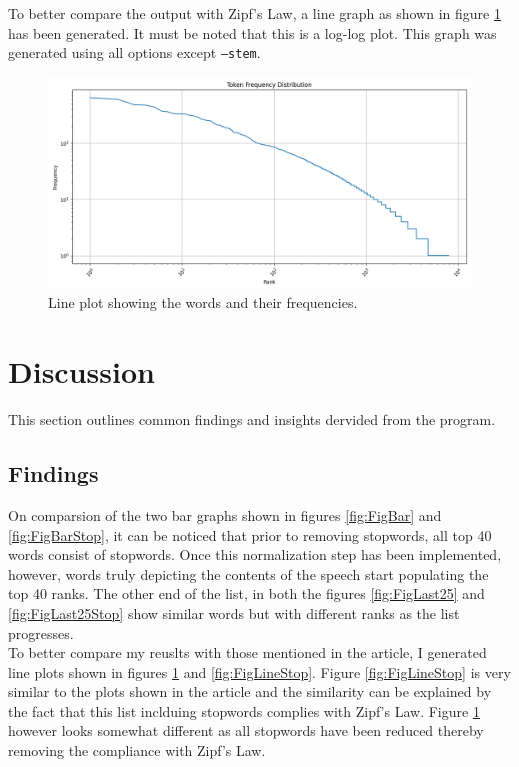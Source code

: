 \documentclass[titlepage]{article}
\begin{document}
To better compare the output with Zipf's Law, a line graph as shown in figure \ref{fig:FigLine} has 
been generated. It must be noted that this is a log-log plot. This graph was generated using all 
options except \texttt{--stem}.

\begin{figure}[H]
    \centering
    \includegraphics[width=\textwidth]{figures/line_plot.png}
    \caption{Line plot showing the words and their frequencies.}
    \label{fig:FigLine}
\end{figure}

\section{Discussion}
This section outlines common findings and insights dervided from the program.
\subsection{Findings}
On comparsion of the two bar graphs shown in figures \ref{fig:FigBar} and \ref{fig:FigBarStop}, it 
can be noticed that prior to removing stopwords, all top 40 words consist of stopwords. Once this 
normalization step has been implemented, however, words truly depicting the contents of the speech 
start populating the top 40 ranks. The other end of the list, in both the figures \ref{fig:FigLast25}
and \ref{fig:FigLast25Stop} show similar words but with different ranks as the list progresses.\\

To better compare my reuslts with those mentioned in the article, I generated line plots shown in 
figures \ref{fig:FigLine} and \ref{fig:FigLineStop}. Figure \ref{fig:FigLineStop} is very similar 
to the plots shown in the article and the similarity can be explained by the fact that this list 
inclduing stopwords complies with Zipf's Law. Figure \ref{fig:FigLine} however looks somewhat different 
as all stopwords have been reduced thereby removing the compliance with Zipf's Law.\\
\end{document}
